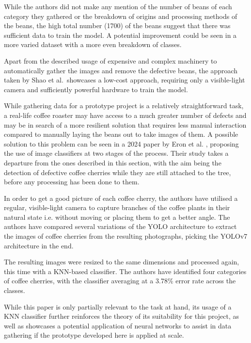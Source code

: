 While the authors did not make any mention of the number of beans of each
category they gathered or the breakdown of origins and processing methods of the
beans, the high total number (1700) of the beans suggest that there was sufficient
data to train the model. A potential improvement could be seen in a more varied
dataset with a more even breakdown of classes.

Apart from the described usage of expensive and complex machinery to
automatically gather the images and remove the defective beans, the approach taken
by Shao et al.\ showcases a low-cost approach, requiring only a visible-light camera
and sufficiently powerful hardware to train the model.

While gathering data for a prototype project is a relatively straightforward task,
a real-life coffee roaster may have access to a much greater number of defects
and may be in search of a more resilient solution that requires less manual
interaction compared to manually laying the beans out to take images of them. A possible
solution to this problem can be seen in a 2024 paper by Eron et al.
\cite{eronCoffeeCherryOnTrees}, proposing the use of image classifiers at two stages
of the process. Their study takes a departure from the ones described in this
section, with the aim being the detection of defective coffee cherries while they
are still attached to the tree, before any processing has been done to them.

In order to get a good picture of each coffee cherry, the authors have utilised a
regular, visible-light camera to capture branches of the coffee plants in their
natural state i.e. without moving or placing them to get a better angle. The
authors have compared several variations of the YOLO architecture to extract the
images of coffee cherries from the resulting photographs, picking the YOLOv7 architecture
in the end.

The resulting images were resized to the same dimensions and processed again,
this time with a KNN-based classifier. The authors have identified four categories
of coffee cherries, with the classifier averaging at a 3.78\% error rate across the
classes.

While this paper is only partially relevant to the task at hand, its usage of a
KNN classifier further reinforces the theory of its suitability for this project,
as well as showcases a potential application of neural networks to assist in data
gathering if the prototype developed here is applied at scale.

